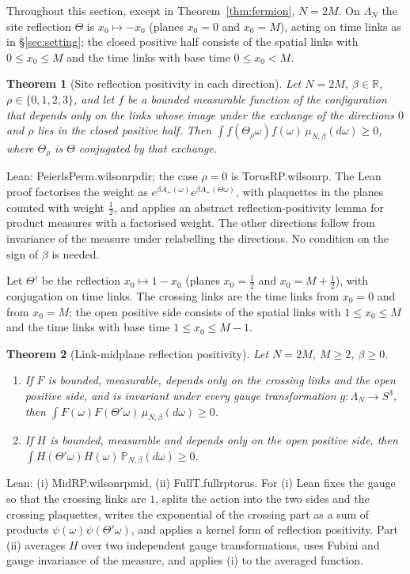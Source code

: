 \documentclass[11pt,a4paper]{article}
\newtheorem{theorem}{Theorem}[section]
\theoremstyle{definition}
\theoremstyle{remark}
\newcommand{\leanus}{\textunderscore\allowbreak{}}
\newcommand{\leandot}{.\allowbreak{}}
\newcommand{\lean}[1]{{\ttfamily\let\_\leanus #1}}
\newcommand{\R}{\mathbb{R}}
\begin{document}
Throughout this section, except in Theorem~\ref{thm:fermion}, $N=2M$. On $\Lambda_N$ the site reflection $\Theta$ is $x_0\mapsto-x_0$ (planes $x_0=0$ and $x_0=M$), acting on time links as in \S\ref{sec:setting}; the closed positive half consists of the spatial links with $0\le x_0\le M$ and the time links with base time $0\le x_0<M$.

\begin{theorem}[Site reflection positivity in each direction]\label{thm:siterp}
Let $N=2M$, $\beta\in\R$, $\rho\in\{0,1,2,3\}$, and let $f$ be a bounded measurable function of the configuration that depends only on the links whose image under the exchange of the directions $0$ and $\rho$ lies in the closed positive half. Then $\int f(\Theta_\rho\omega)f(\omega)\,\mu_{N,\beta}(d\omega)\ge0$, where $\Theta_\rho$ is $\Theta$ conjugated by that exchange.
\end{theorem}
Lean: \lean{PeierlsPerm\leandot{}wilson\_rp\_dir}; the case $\rho=0$ is \lean{TorusRP\leandot{}wilson\_rp}. The Lean proof factorises the weight as $e^{\beta A_+(\omega)}e^{\beta A_+(\Theta\omega)}$, with plaquettes in the planes counted with weight $\frac12$, and applies an abstract reflection-positivity lemma for product measures with a factorised weight. The other directions follow from invariance of the measure under relabelling the directions. No condition on the sign of $\beta$ is needed.

Let $\Theta'$ be the reflection $x_0\mapsto1-x_0$ (planes $x_0=\frac12$ and $x_0=M+\frac12$), with conjugation on time links. The crossing links are the time links from $x_0=0$ and from $x_0=M$; the open positive side consists of the spatial links with $1\le x_0\le M$ and the time links with base time $1\le x_0\le M-1$.

\begin{theorem}[Link-midplane reflection positivity]\label{thm:midrp}
Let $N=2M$, $M\ge2$, $\beta\ge0$.
\begin{enumerate}[label=(\roman*),leftmargin=2em]
\item If $F$ is bounded, measurable, depends only on the crossing links and the open positive side, and is invariant under every gauge transformation $g:\Lambda_N\to S^3$, then $\int F(\omega)F(\Theta'\omega)\,\mu_{N,\beta}(d\omega)\ge0$.
\item If $H$ is bounded, measurable and depends only on the open positive side, then $\int H(\Theta'\omega)H(\omega)\,\mathbb P_{N,\beta}(d\omega)\ge0$.
\end{enumerate}
\end{theorem}
Lean: (i) \lean{MidRP\leandot{}wilson\_rp\_mid}, (ii) \lean{FullT\leandot{}full\_rp\_torus}. For (i) Lean fixes the gauge so that the crossing links are $1$, splits the action into the two sides and the crossing plaquettes, writes the exponential of the crossing part as a sum of products $\psi(\omega)\psi(\Theta'\omega)$, and applies a kernel form of reflection positivity. Part (ii) averages $H$ over two independent gauge transformations, uses Fubini and gauge invariance of the measure, and applies (i) to the averaged function.
\end{document}
